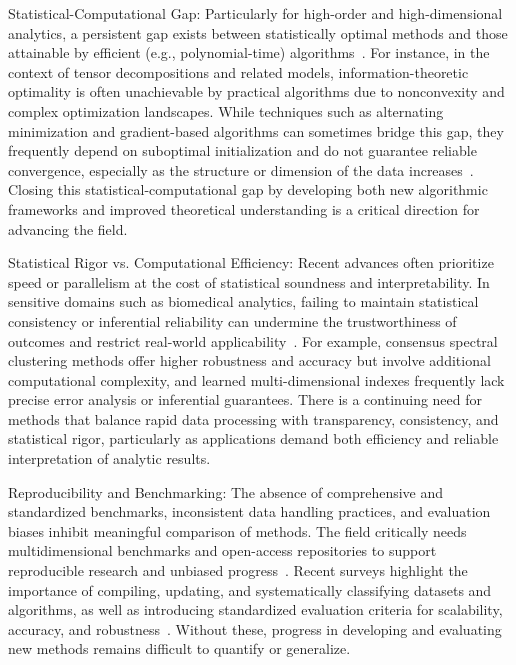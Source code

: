 \documentclass[sigconf]{acmart}
\begin{document}
Statistical-Computational Gap: Particularly for high-order and high-dimensional analytics, a persistent gap exists between statistically optimal methods and those attainable by efficient (e.g., polynomial-time) algorithms~\cite{ref104}. For instance, in the context of tensor decompositions and related models, information-theoretic optimality is often unachievable by practical algorithms due to nonconvexity and complex optimization landscapes. While techniques such as alternating minimization and gradient-based algorithms can sometimes bridge this gap, they frequently depend on suboptimal initialization and do not guarantee reliable convergence, especially as the structure or dimension of the data increases~\cite{ref104,ref110}. Closing this statistical-computational gap by developing both new algorithmic frameworks and improved theoretical understanding is a critical direction for advancing the field.

Statistical Rigor vs. Computational Efficiency: Recent advances often prioritize speed or parallelism at the cost of statistical soundness and interpretability. In sensitive domains such as biomedical analytics, failing to maintain statistical consistency or inferential reliability can undermine the trustworthiness of outcomes and restrict real-world applicability~\cite{ref110,ref116}. For example, consensus spectral clustering methods offer higher robustness and accuracy but involve additional computational complexity, and learned multi-dimensional indexes frequently lack precise error analysis or inferential guarantees. There is a continuing need for methods that balance rapid data processing with transparency, consistency, and statistical rigor, particularly as applications demand both efficiency and reliable interpretation of analytic results.

Reproducibility and Benchmarking: The absence of comprehensive and standardized benchmarks, inconsistent data handling practices, and evaluation biases inhibit meaningful comparison of methods. The field critically needs multidimensional benchmarks and open-access repositories to support reproducible research and unbiased progress~\cite{ref110,ref116}. Recent surveys highlight the importance of compiling, updating, and systematically classifying datasets and algorithms, as well as introducing standardized evaluation criteria for scalability, accuracy, and robustness~\cite{ref110}. Without these, progress in developing and evaluating new methods remains difficult to quantify or generalize.
\end{document}
